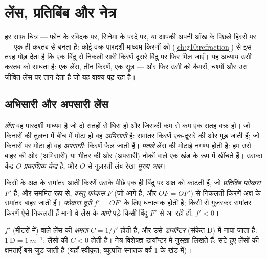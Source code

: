 \chapter{लेंस, प्रतिबिंब और नेत्र}\label{ch:g11:lenses-and-eye}

हर साफ़ चित्र --- फ़ोन के संवेदक पर, सिनेमा के परदे पर, या आपकी अपनी आँख
के पिछले हिस्से पर --- एक ही करतब से बनता है: कोई वक्र पारदर्शी माध्यम
किरणों को  (\cref{ch:g10:refraction}) से इस तरह मोड़ देता है कि एक बिंदु से
निकली सारी किरणें दूसरे बिंदु पर फिर मिल जाएँ। यह अध्याय उसी करतब को
साधता है: एक लेंस, तीन किरणें, एक सूत्र --- और फिर उसी को
कैमरों, चश्मों और उस जीवित लेंस पर तान देता है जो यह वाक्य पढ़
रहा है।

\section{अभिसारी और अपसारी लेंस}

\begin{definition}[पतला लेंस]\label{def:g11:lenses-and-eye:lens}
\emph{लेंस} वह पारदर्शी माध्यम है जो दो सतहों से घिरा हो और
जिसकी कम से कम एक सतह वक्र हो। जो किनारों की तुलना में बीच में मोटा हो
वह \emph{अभिसारी} है: समांतर किरणें एक-दूसरे की ओर
मुड़ जाती हैं; जो किनारों पर मोटा हो वह
\emph{अपसारी}: किरणें फैल जाती हैं।
\emph{पतले} लेंस की मोटाई नगण्य होती है: हम उसे बाहर की
ओर (अभिसारी) या भीतर की ओर (अपसारी) नोकों वाले एक खंड के रूप में खींचते
हैं। उसका केंद्र $O$ \emph{प्रकाशिक केंद्र} है,
और $O$ से गुज़रती लंब रेखा \emph{मुख्य अक्ष}।
\end{definition}

\begin{definition}[फोकस और फोकस दूरी]\label{def:g11:lenses-and-eye:focal}
किसी  के अक्ष के समांतर आती किरणें उसके पीछे एक ही
बिंदु पर अक्ष को काटती हैं, जो \emph{प्रतिबिंब फोकस} $F'$
है; और सममित रूप से, \emph{वस्तु फोकस} $F$ (जो आगे है, और $OF = OF'$) से
निकलती किरणें अक्ष के समांतर बाहर जाती हैं। \emph{फोकस दूरी} $f' = \overline{OF'}$  के लिए धनात्मक होती है; किसी
 से गुज़रकर समांतर किरणें ऐसे निकलती हैं मानो वे
लेंस के \emph{आगे} पड़े किसी बिंदु $F'$ से आ रही हों: $f' < 0$।
\end{definition}

\begin{definition}[क्षमता]\label{def:g11:lenses-and-eye:vergence}
$f'$ (मीटरों में)  वाले लेंस की
\emph{क्षमता} $C = 1/f'$ होती है, और उसे
\emph{डायॉप्टर} (संकेत D) में नापा जाता है: $1~\text{D} = \qty{1}{m^{-1}}$;
 लेंसों की $C < 0$ होती है। नेत्र-विशेषज्ञ डायॉप्टर में
नुस्ख़ा लिखते हैं: सटे हुए  लेंसों की क्षमताएँ बस जुड़ जाती
हैं (यहाँ स्वीकृत; व्युत्पत्ति स्नातक वर्ष 1 के खंड में)।
\end{definition}

